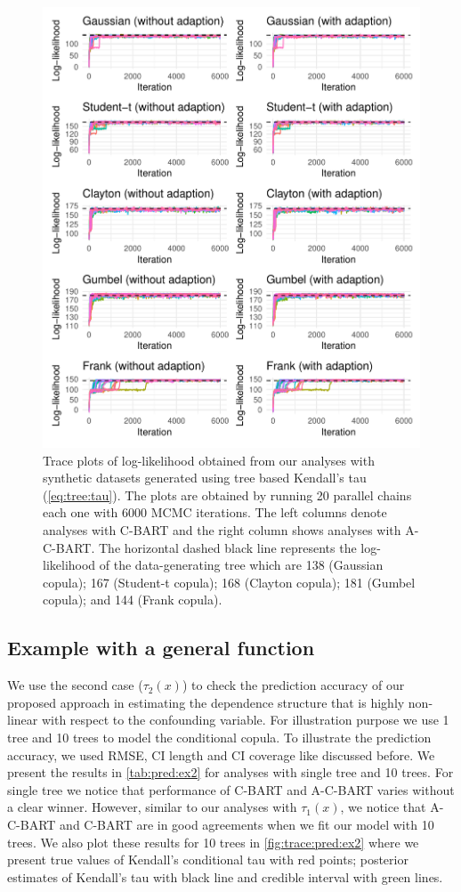 \documentclass{amsart}
\begin{document}
\begin{figure}
	\centering
	\includegraphics[width = 0.95\linewidth]{"case_1_likelihood.pdf"}
	\caption{Trace plots of log-likelihood obtained from our analyses with synthetic datasets generated using tree based Kendall's tau (\cref{eq:tree:tau}). The plots are obtained by running 20 parallel chains each one with 6000 MCMC iterations. The left columns denote analyses with C-BART and the right column shows analyses with A-C-BART. The horizontal dashed black line represents the log-likelihood of the data-generating tree which are 138 (Gaussian copula); 167 (Student-t copula); 168 (Clayton copula); 181 (Gumbel copula); and 144 (Frank copula).}
	\label{fig:trace:like:ex1}
\end{figure}

\subsection{Example with a general function}
We use the second case ($\tau_2(x)$) to check the prediction accuracy of our proposed approach in estimating the dependence structure that is highly non-linear with respect to the confounding variable. For illustration purpose we use 1 tree and 10 trees to model the conditional copula. To illustrate the prediction accuracy, we used RMSE, CI length and CI coverage like discussed before. We present the results in \cref{tab:pred:ex2} for analyses with single tree and 10 trees. For single tree we notice that performance of C-BART and A-C-BART varies without a clear winner. However, similar to our analyses with $\tau_1(x)$, we notice that A-C-BART and C-BART are in good agreements when we fit our model with 10 trees. We also plot these results for 10 trees in \cref{fig:trace:pred:ex2} where we present true values of Kendall's conditional tau with red points; posterior estimates of Kendall's tau with black line and credible interval with green lines. 
\end{document}
